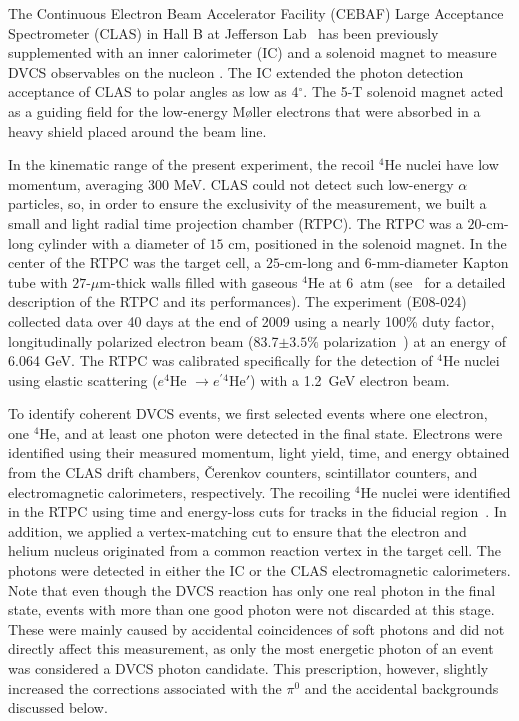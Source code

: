 \documentclass[twocolumn,nofootinbib,prl,superscriptaddress,secnumarabic,amssymb,nobibnotes,aps,floatfix]{revtex4}
\begin{document}
The Continuous Electron Beam Accelerator Facility (CEBAF) Large Acceptance 
Spectrometer (CLAS) in Hall B at Jefferson Lab~\cite{Mecking:2003zu} has been 
previously supplemented with an inner calorimeter (IC) and a solenoid magnet to 
measure DVCS observables on the nucleon
\cite{Girod:2007aa,Gavalian:2009,Seder:2015,Pisano:2015,Jo:2015ema}. The IC 
extended the photon detection acceptance of CLAS to polar angles as low as 
4$^{\circ}$. The 5-T solenoid magnet acted as a guiding field for the 
low-energy M\o{}ller electrons that were absorbed in a  
heavy shield placed around the beam line. 

In the kinematic range of the present experiment, the recoil $^4$He nuclei 
have low momentum, averaging 300 MeV. CLAS could not detect such low-energy 
$\alpha$ particles, so, in order to ensure the exclusivity of the measurement, 
we built a small and light radial time projection chamber (RTPC). The RTPC was 
a $20$-cm-long cylinder with a diameter of $15$ cm, positioned in the solenoid 
magnet. In the center of the RTPC was the target cell, a $25$-cm-long and 
$6$-mm-diameter Kapton tube with $27$-$\mu$m-thick walls filled with gaseous 
$^4$He at 6~atm (see~\cite{Dupre:2017upj} for a detailed description of the 
RTPC and its performances). The experiment (E08-024)~\cite{Hafidi:2008pr} 
collected data over 40 days at the end of 2009 using a nearly 100\% duty 
factor, longitudinally polarized electron beam (83.7$\pm 3.5 \%$ 
polarization~\cite{Perrin:thesis}) at an energy of 6.064 GeV. The RTPC was 
calibrated specifically for the detection of $^4$He nuclei using elastic 
scattering ($e^4$He $\to e^\prime$$^4$He$'$) with a 1.2~GeV electron beam.
 
To identify coherent DVCS events, we first selected events where one electron, 
one $^4$He, and at least one photon were detected in the final state. Electrons 
were identified using their measured momentum, light yield, time, and energy obtained from 
the CLAS drift chambers, \v{C}erenkov counters, scintillator counters, 
and electromagnetic calorimeters, respectively. The recoiling $^4$He nuclei 
were identified in the RTPC using time and energy-loss cuts for tracks in the 
fiducial region~\cite{Hattawy:thesis}. In addition, we applied a 
vertex-matching cut to ensure that the electron and helium nucleus originated 
from a common reaction vertex in the target cell. The photons were detected in 
either the IC or the CLAS electromagnetic calorimeters. Note that even though 
the DVCS reaction has only one real photon in the final state, events with more 
than one good photon were not discarded at this stage. These
were mainly caused by accidental coincidences of soft photons and did not directly
affect this measurement, as only the most energetic photon of an event was 
considered a DVCS photon candidate. This prescription, however, slightly 
increased the corrections associated with the $\pi^0$ and the accidental 
backgrounds discussed below. 
\end{document}
